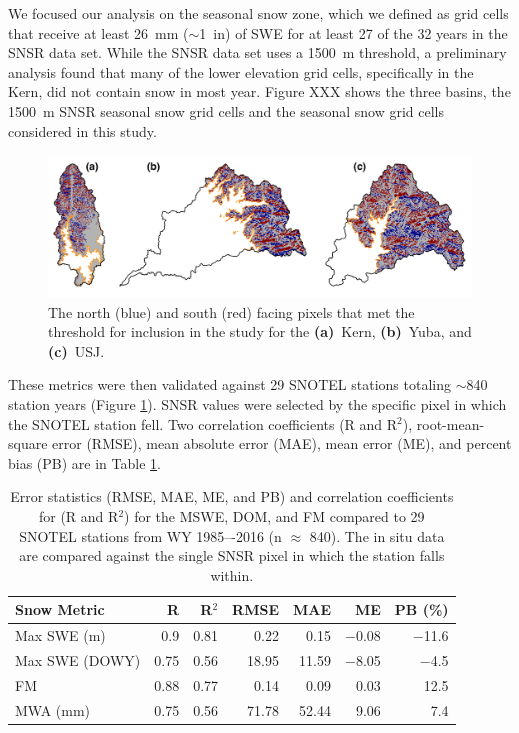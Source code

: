 We focused our analysis on the seasonal snow zone, which we defined as grid cells that receive at least 26~mm ($\sim$1~in) of SWE for at least 27 of the 32 years in the SNSR data set. While the SNSR data set uses a 1500~m threshold, a preliminary analysis found that many of the lower elevation grid cells, specifically in the Kern, did not contain snow in most year. Figure XXX shows the three basins, the 1500~m SNSR seasonal snow grid cells and the seasonal snow grid cells considered in this study.

\begin{figure}[t]
\centering
\includegraphics[width=\textwidth]{figures/ch2_figs/kuy_snow_metric_area_v2.png}
\caption{The north (blue) and south (red) facing pixels that met the threshold for inclusion in the study for the \textbf{(a)}~Kern, \textbf{(b)}~Yuba, and \textbf{(c)}~USJ.}
\label{kuy_study_area}
\end{figure}

These metrics were then validated against 29 SNOTEL stations totaling $\sim$840 station years (Figure \ref{kuy_study_area}). SNSR values were selected by the specific pixel in which the SNOTEL station fell. Two correlation coefficients (R and R$^{2}$), root-mean-square error (RMSE), mean absolute error (MAE), mean error (ME), and percent bias (PB) are in Table \ref{tab:snow_metrics_val_table}.


\begin{table}[htbp]
  \centering
  \caption{Error statistics (RMSE, MAE, ME, and PB) and correlation coefficients for (R and R$^{2}$) for the MSWE, DOM, and FM compared to 29 SNOTEL stations from WY 1985–-2016 (n $\approx$ 840). The in situ data are compared against the single SNSR pixel in which the station falls within.}
  \label{tab:snow_metrics_val_table}
  \begin{tabular}{lrrrrrr}
    \toprule
    Snow Metric & R & R$^{2}$ & RMSE & MAE & ME & PB (\%) \\
    \midrule
    Max SWE (m) & 0.9 & 0.81 & 0.22 & 0.15 & $-$0.08 & $-$11.6 \\
    Max SWE (DOWY) & 0.75 & 0.56 & 18.95 & 11.59 & $-$8.05 & $-$4.5 \\
    FM & 0.88 & 0.77 & 0.14 & 0.09 & 0.03 & 12.5 \\
    MWA (mm) & 0.75 & 0.56 & 71.78 & 52.44 & 9.06 & 7.4 \\
    \bottomrule
  \end{tabular}
\end{table}

